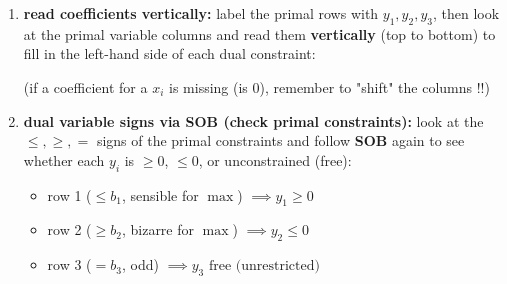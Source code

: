 \documentclass[a4paper, 11pt]{report}
\begin{document}
\begin{enumerate}
    \item \textbf{read coefficients vertically:} label the primal rows with {\color{gray}$y_1, y_2, y_3$}, then look at the primal variable columns and read them \textbf{vertically} (top to bottom) to fill in the left-hand side of each dual constraint:

    \smallskip
    \noindent{}
\subitem (if a coefficient for a $x_{i}$ is missing (is $0$), remember to "shift" the columns !!)

    \item \textbf{dual variable signs via SOB (check primal constraints):} look at the $\le, \ge, =$ signs of the primal constraints and follow \textbf{SOB} again to see whether each $y_i$ is $\ge 0$, $\le 0$, or unconstrained (free):
    \begin{itemize}
        \item row 1 ($\le b_1$, sensible for $\max$) $\implies y_1 \ge 0$
        \item row 2 ($\ge b_2$, bizarre for $\max$) $\implies y_2 \le 0$
        \item row 3 ($= b_3$, odd) $\implies y_3 \text{ free (unrestricted)}$
    \end{itemize}
\end{enumerate}
\end{document}
